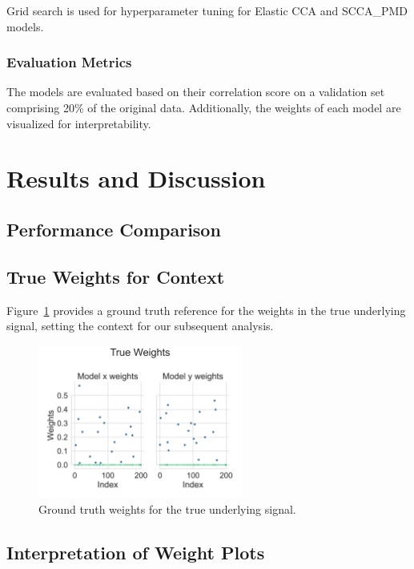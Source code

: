 Grid search is used for hyperparameter tuning for Elastic CCA and SCCA\_PMD models.

\subsubsection{Evaluation Metrics}

The models are evaluated based on their correlation score on a validation set comprising 20\% of the original data. Additionally, the weights of each model are visualized for interpretability.

\section{Results and Discussion}

\subsection{Performance Comparison}

\subsection{True Weights for Context}

Figure~\ref{fig:True_weights} provides a ground truth reference for the weights in the true underlying signal, setting the context for our subsequent analysis.

\begin{figure}[h]
    \centering
    \includegraphics[width=0.6\textwidth]{figures/als/simulated/True_weights.svg}
    \caption{Ground truth weights for the true underlying signal.}
    \label{fig:True_weights}
\end{figure}

\subsection{Interpretation of Weight Plots}


